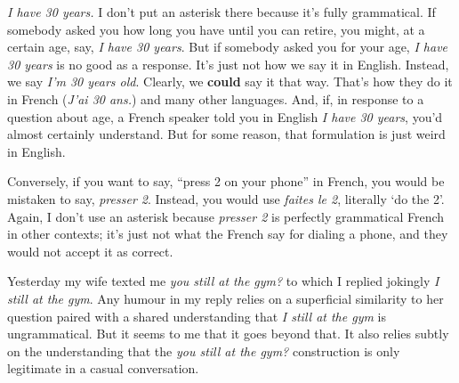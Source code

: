 \textit{I have 30 years.} I don't put an asterisk there because it's fully grammatical. If somebody asked you how long you have until you can retire, you might, at a certain age, say, \textit{I have 30 years}. But if somebody asked you for your age, \textit{I have 30 years} is no good as a response. It's just not how we say it in English. Instead, we say \textit{I'm 30 years old}. Clearly, we \textbf{could} say it that way. That's how they do it in French (\textit{J'ai 30 ans.}) and many other languages. And, if, in response to a question about age, a French speaker told you in English \textit{I have 30 years}, you'd almost certainly understand. But for some reason, that formulation is just weird in English.

Conversely, if you want to say, ``press 2 on your phone'' in French, you would be mistaken to say, \textit{presser 2}. Instead, you would use \textit{faites le 2}, literally `do the 2'. Again, I don't use an asterisk because \textit{presser 2} is perfectly grammatical French in other contexts; it's just not what the French say for dialing a phone, and they would not accept it as correct.

\bigskip

Yesterday my wife texted me \textit{you still at the gym?} to which I replied jokingly \textit{I still at the gym}. Any humour in my reply relies on a superficial similarity to her question paired with a shared understanding that \textit{I still at the gym} is ungrammatical. But it seems to me that it goes beyond that. It also relies subtly on the understanding that the \textit{you still at the gym?} construction is only legitimate in a casual conversation.

\ea
    \z
\z
\ea
    \z
\z
\ea
    \z
\z
\ea
    \z
\z
\ea
    \z
\z
\ea
    \z
\z
\ea
    \z
\z


